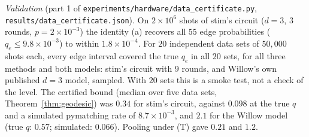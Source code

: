 \noindent\emph{Validation} (part 1 of \texttt{experiments/hardware/data\_certificate.py}, \texttt{results/data\_certificate.json}). On $2\times10^6$ shots of stim's circuit ($d=3$, $3$ rounds, $p=2\times10^{-3}$) the identity (a) recovers all $55$ edge probabilities ($q_e\le9.8\times10^{-3}$) to within $1.8\times10^{-4}$. For $20$ independent data sets of $50{,}000$ shots each, every edge interval covered the true $q_e$ in all $20$ sets, for all three methods and both models: stim's circuit with $9$ rounds, and Willow's own published $d=3$ model, sampled. With $20$ sets this is a smoke test, not a check of the level. The certified bound (median over five data sets, Theorem~\ref{thm:geodesic}) was $0.34$ for stim's circuit, against $0.098$ at the true $q$ and a simulated pymatching rate of $8.7\times10^{-3}$, and $2.1$ for the Willow model (true $q$: $0.57$; simulated: $0.066$). Pooling under (T) gave $0.21$ and $1.2$.


